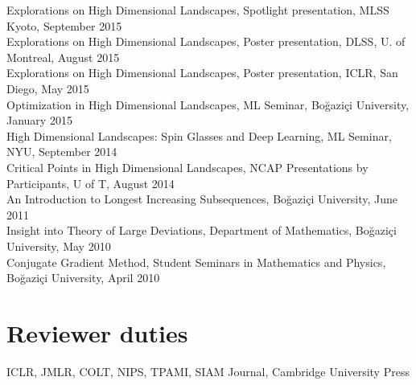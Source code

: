 \documentclass[10pt,letterpaper]{article}
\renewenvironment{itemize}
{
\begin{list}{}{\setlength{\leftmargin}{1.5em}}
}
{
  \end{list}
}
\begin{document}
\begin{itemize}
Explorations on High Dimensional Landscapes, Spotlight presentation, MLSS Kyoto, September 2015 \\ 
Explorations on High Dimensional Landscapes, Poster presentation, DLSS, U. of Montreal, August 2015 \\ 
Explorations on High Dimensional Landscapes, Poster presentation, ICLR, San Diego, May 2015 \\ 
Optimization in High Dimensional Landscapes, ML Seminar, Bo\u{g}azi\c{c}i University, January 2015 \\ 
High Dimensional Landscapes: Spin Glasses and Deep Learning, ML Seminar, NYU, September 2014 \\ 
Critical Points in High Dimensional Landscapes, NCAP Presentations by Participants, U of T, August 2014 \\ 
An Introduction to Longest Increasing Subsequences, Bo\u{g}azi\c{c}i University, June 2011 \\ 
Insight into Theory of Large Deviations, Department of Mathematics, Bo\u{g}azi\c{c}i University, May 2010 \\ 
Conjugate Gradient Method, Student Seminars in Mathematics and Physics, Bo\u{g}azi\c{c}i University, April 2010
\end{itemize}

\section*{Reviewer duties}
\begin{itemize}
    \item ICLR, JMLR,  COLT, NIPS, TPAMI, SIAM Journal, Cambridge University Press
\end{itemize}

\end{document}
